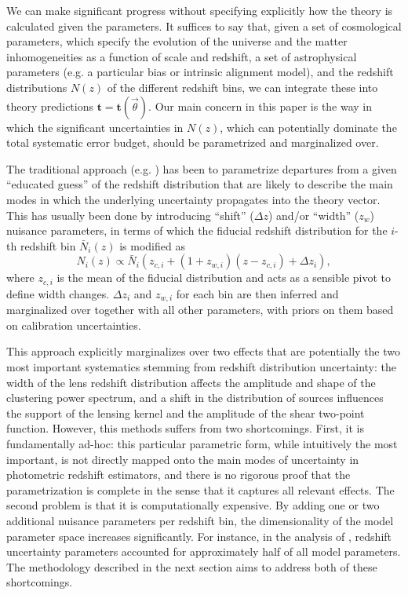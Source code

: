 \documentclass[a4paper,11pt]{article}
\newcommand{\vt}{\mathbf{t}}
\begin{document}
      We can make significant progress without specifying explicitly how the theory is calculated given the parameters. It suffices to say that, given a set of cosmological parameters, which specify the evolution of the universe and the matter inhomogeneities as a function of scale and redshift, a set of astrophysical parameters (e.g. a particular bias or intrinsic alignment model), and the redshift distributions $N(z)$ of the different redshift bins, we can integrate these into theory predictions $\vt=\vt(\vec{\theta})$. Our main concern in this paper is the way in which the significant uncertainties in $N(z)$, which can potentially dominate the total systematic error budget, should be parametrized and marginalized over.

      The traditional approach (e.g. \cite{2018PhRvD..98d3526A,1912.08209}) has been to parametrize departures from a given ``educated guess'' of the redshift distribution that are likely to describe the main modes in which the underlying uncertainty propagates into the theory vector. This has usually been done by introducing ``shift'' ($\Delta z$) and/or ``width'' ($z_w$) nuisance parameters, in terms of which the fiducial redshift distribution for the $i$-th redshift bin $\bar{N}_i(z)$ is modified as
      \begin{equation}
        N_{i}(z) \propto \bar{N}_{i}\left(z_{c,i} + (1 + z_{w, i})(z-z_{c, i}) + \Delta z_{i}\right), \label{eq:photo-z-model}
      \end{equation}
      where $z_{c,i}$ is the mean of the fiducial distribution and acts as a sensible pivot to define width changes. $\Delta z_i$ and $z_{w,i}$ for each bin are then inferred and marginalized over together with all other parameters, with priors on them based on calibration uncertainties.

      This approach explicitly marginalizes over two effects that are potentially the two most important systematics stemming from redshift distribution uncertainty: the width of the lens redshift distribution affects the amplitude and shape of the clustering power spectrum, and a shift in the distribution of sources influences the support of the lensing kernel and the amplitude of the shear two-point function. However, this methods suffers from two shortcomings. First, it is fundamentally ad-hoc: this particular parametric form, while intuitively the most important, is not directly mapped onto the main modes of uncertainty in photometric redshift estimators, and there is no rigorous proof that the parametrization is complete in the sense that it captures all relevant effects. The second problem is that it is computationally expensive. By adding one or two additional nuisance parameters per redshift bin, the dimensionality of the model parameter space increases significantly. For instance, in the analysis of \cite{1912.08209}, redshift uncertainty parameters accounted for approximately half of all model parameters. The methodology described in the next section aims to address both of these shortcomings.
\end{document}
